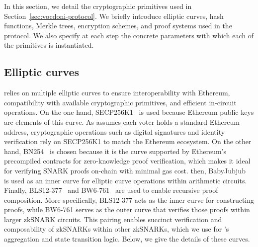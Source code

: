 
In this section, we detail the cryptographic primitives used in Section~\ref{sec:vocdoni-protocol}. We briefly introduce elliptic curves, hash functions, Merkle trees, encryption schemes, and proof systems used in the protocol. We also specify at each step the concrete parameters with which each of the primitives is instantiated.\\



\subsection{Elliptic curves}
\label{sec:cryptographic-primitives:elliptic-curves}

\Davinci relies on multiple elliptic curves to ensure interoperability with Ethereum, compatibility with available cryptographic primitives, and efficient in-circuit operations. On the one hand, SECP256K1~\cite{brown10sec} is used because Ethereum public keys are elements of this curve. As \Davinci assumes each voter holds a standard Ethereum address, cryptographic operations such as digital signatures and identity verification rely on SECP256K1 to match the Ethereum ecosystem. On the other hand, BN254~\cite{jancar20bn256} is chosen because it is the curve supported by Ethereum's precompiled contracts for zero-knowledge proof verification, which makes it ideal for verifying SNARK proofs on-chain with minimal gas cost. then, BabyJubjub~\cite{belles21twisted} is used as an inner curve for elliptic curve operations within arithmetic circuits. Finally, BLS12-377~\cite{bowe20zexe} and BW6-761~\cite{elhousni20optimized} are used to enable recursive proof composition. More specifically, BLS12-377 acts as the inner curve for constructing proofs, while BW6-761 serves as the outer curve that verifies those proofs within larger zkSNARK circuits. This pairing enables succinct verification and composability of zkSNARKs within other zkSNARKs, which we use for \davinci’s aggregation and state transition logic. Below, we give the details of these curves.

